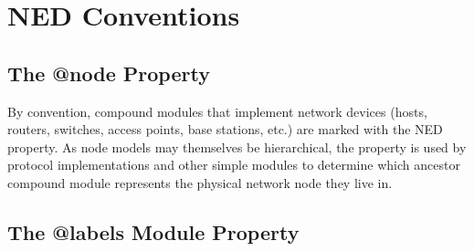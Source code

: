\iffalse TODO
\section{Publish-Subscribe Communication within Nodes}

The \nedtype{NotificationBoard} module makes it possible for several modules to
communicate in a publish-subscribe manner. For example, the radio module
(\nedtype{Ieee80211Radio}) fires a \textit{"radio state changed"} notification when
the state of the radio channel changes (from TRANSMIT to IDLE, for example),
and it will be delivered to other modules that have previously subscribed
to that notification category. The notification mechanism uses C++ functions
calls, no message sending is involved.

The notification board submodule within the host (router) must be called
\ttt{notificationBoard} for other modules to find it.
\fi

\iffalse TODO
\section{Network interfaces}

todo...
\fi

\iffalse TODO
\section{The wireless infrastructure}

todo...
\fi


\section{NED Conventions}

\subsection{The @node Property}

By convention, compound modules that implement network devices (hosts,
routers, switches, access points, base stations, etc.) are marked with the
 NED property. As node models may themselves be hierarchical, the
 property is used by protocol implementations and other simple
modules to determine which ancestor compound module represents the physical
network node they live in.

\subsection{The @labels Module Property}

